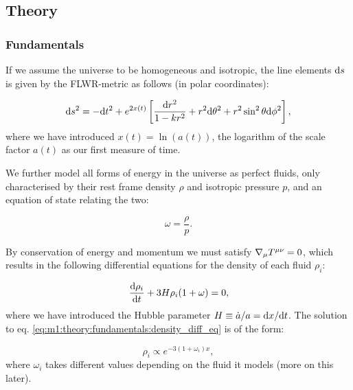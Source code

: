 \subsection{Theory}\label{sec:m1:theory}

\subsubsection{Fundamentals}\label{sec:m1:theory:fundamentals}

If we assume the universe to be homogeneous and isotropic, the line elements $\mathrm{d} s$ is given by the FLWR-metric as follows (in polar coordinates)\cite[eq. 1.1.11]{weinberg2008cosmology}:

\begin{equation}\label{eq:m1:theory:fundamentals:FLWR_line_element}
    \mathrm{d} s^2 = -\mathrm{d} t^2 + e^{2x(t)}\left[ \frac{\mathrm{d} r^2}{1-kr^2}+r^2\mathrm{d}\theta^2 + r^2\sin^2\theta\mathrm{d}\phi^2 \right],
\end{equation}
where we have introduced $x(t) = \ln(a(t))$, the logarithm of the scale factor $a(t)$  as our first measure of time. 

We further model all forms of energy in the universe as perfect fluids, only characterised by their rest frame density $\rho$ and isotropic pressure $p$, and an equation of state relating the two:

\begin{equation}\label{eq:m1:theory:fundamentals:equation_of_state}
    \omega=\frac{\rho}{p}.
\end{equation}

By conservation of energy and momentum we must satisfy $\nabla_\mu T^{\mu\nu}=0$, which results in the following differential equations for the density  of each fluid $\rho_i$:

\begin{equation}\label{eq:m1:theory:fundamentals:density_diff_eq}
    \dv{\rho_i}{t} +3H\rho_i(1+\omega) = 0,
\end{equation}
where we have introduced the Hubble parameter $H \equiv\dot{a}/a=\mathrm{d} x/\mathrm{d} t$. The solution to eq. \ref{eq:m1:theory:fundamentals:density_diff_eq} is of the form:

\begin{equation}\label{eq:m1:theory:fundamentals:solution_to_density_diff_eq}
    \rho_i \propto e^{-3(1+\omega_i)x},
\end{equation}
where $\omega_i$ takes different values depending on the fluid it models (more on this later). 

